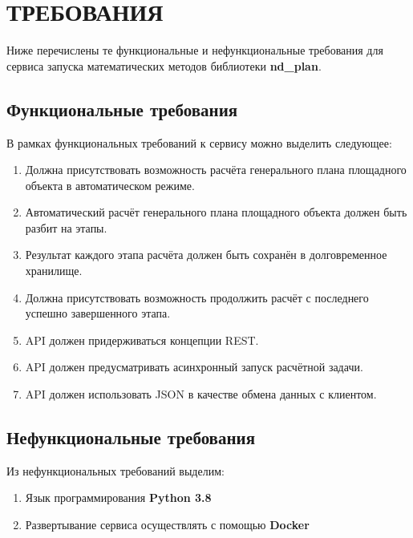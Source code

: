 \section*{\Large{ТРЕБОВАНИЯ}}

Ниже перечислены те функциональные и нефункциональные требования
для сервиса запуска математических методов библиотеки \textbf{nd\_plan}.

\subsection*{\large{Функциональные требования}}

В рамках функциональных требований к сервису можно выделить следующее:
\begin{enumerate}
    \item {
       Должна присутствовать возможность расчёта генерального плана площадного объекта в автоматическом режиме.
    }
    \item {
        Автоматический расчёт генерального плана площадного объекта должен быть разбит на этапы.
    }
    \item {
        Результат каждого этапа расчёта должен быть сохранён в долговременное хранилище.
    }
    \item {
        Должна присутствовать возможность продолжить расчёт с последнего успешно завершенного этапа.
    }
    \item API должен придерживаться концепции REST.
    \item API должен предусматривать асинхронный запуск расчётной задачи.
    \item API должен использовать JSON в качестве обмена данных с клиентом.
\end{enumerate}

\subsection*{\large{Нефункциональные требования}}

Из нефункциональных требований выделим:
\begin{enumerate}
    \item Язык программирования \textbf{Python 3.8}
    \item Развертывание сервиса осуществлять с помощью \textbf{Docker}
\end{enumerate}
